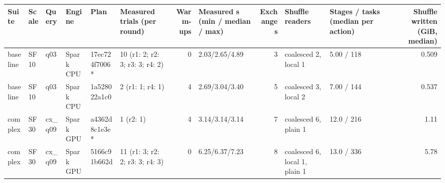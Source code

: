 \begin{longtable}{llllllrlrllr}
\toprule
Suite & Scale & Query & Engine & Plan & Measured trials (per round) & Warm-ups & Measured s (min / median / max) & Exchanges & Shuffle readers & Stages / tasks (median per action) & Shuffle written (GiB, median) \\
\midrule
\endhead
\bottomrule
\endfoot
baseline & SF10 & q03 & Spark CPU & 17ec724f7006 * & 10 (r1: 2; r2: 3; r3: 3; r4: 2) & 0 & 2.03/2.65/4.89 & 3 & coalesced 2, local 1 & 5.00 / 118 & 0.509 \\
baseline & SF10 & q03 & Spark CPU & 1a528022a1c0 & 2 (r1: 1; r4: 1) & 4 & 2.69/3.04/3.40 & 5 & coalesced 3, local 2 & 7.00 / 144 & 0.537 \\
complex & SF30 & cx\_q09 & Spark GPU & a4362d8c1e3e * & 1 (r2: 1) & 4 & 3.14/3.14/3.14 & 7 & coalesced 6, plain 1 & 12.0 / 216 & 1.11 \\
complex & SF30 & cx\_q09 & Spark GPU & 5166c91b662d & 11 (r1: 3; r2: 2; r3: 3; r4: 3) & 0 & 6.25/6.37/7.23 & 8 & coalesced 6, local 1, plain 1 & 13.0 / 336 & 5.78 \\
\end{longtable}
